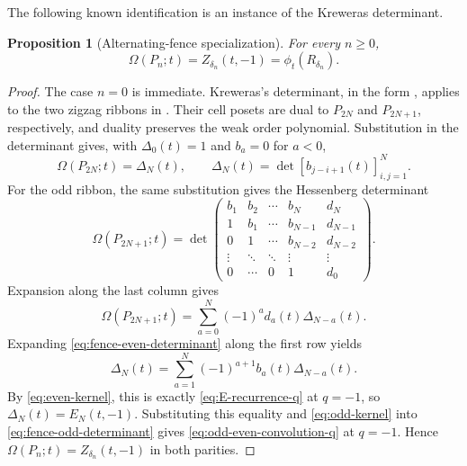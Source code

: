 \documentclass{amsart}
\newtheorem{proposition}[proposition]{Proposition}
\theoremstyle{definition}
\theoremstyle{remark}
\begin{document}
The following known identification is an instance of the Kreweras
determinant.

\begin{proposition}[Alternating-fence specialization]
\label{prop:staircase-specialization}
For every \(n\geq0\),
\begin{equation}
 \Omega(P_n;t)=Z_{\delta_n}(t,-1)=\phi_t(R_{\delta_n}).
 \label{eq:staircase-specialization}
\end{equation}
\end{proposition}

\begin{proof}
The case $n=0$ is immediate.  Kreweras's determinant, in the form
\cite[Proposition~2.2]{FerroniMoralesPanova}, applies to the two zigzag
ribbons in \cite[Equation~(5.1)]{FerroniMoralesPanova}.  Their cell posets are
dual to $P_{2N}$ and $P_{2N+1}$, respectively, and duality preserves the weak
order polynomial.  Substitution in the determinant gives, with
$\Delta_0(t)=1$ and $b_a=0$ for $a<0$,
\begin{equation}
 \Omega(P_{2N};t)=\Delta_N(t),
 \qquad
 \Delta_N(t)=\det[b_{j-i+1}(t)]_{i,j=1}^{N}.
 \label{eq:fence-even-determinant}
\end{equation}
For the odd ribbon, the same substitution gives the Hessenberg determinant
\begin{equation*}
 \Omega(P_{2N+1};t)=
 \det\!\begin{pmatrix}
 b_1&b_2&\cdots&b_N&d_N\\
 1&b_1&\cdots&b_{N-1}&d_{N-1}\\
 0&1&\cdots&b_{N-2}&d_{N-2}\\
 \vdots&\ddots&\ddots&\vdots&\vdots\\
 0&\cdots&0&1&d_0
 \end{pmatrix}.
\end{equation*}
Expansion along the last column gives
\begin{equation}
 \Omega(P_{2N+1};t)
 =\sum_{a=0}^{N}(-1)^a d_a(t)\Delta_{N-a}(t).
 \label{eq:fence-odd-determinant}
\end{equation}
Expanding \eqref{eq:fence-even-determinant} along the first row yields
\[
 \Delta_N(t)=\sum_{a=1}^{N}(-1)^{a+1}b_a(t)\Delta_{N-a}(t).
\]
By \eqref{eq:even-kernel}, this is exactly
\eqref{eq:E-recurrence-q} at $q=-1$, so
$\Delta_N(t)=E_N(t,-1)$.  Substituting this equality and
\eqref{eq:odd-kernel} into \eqref{eq:fence-odd-determinant} gives
\eqref{eq:odd-even-convolution-q} at $q=-1$.  Hence
$\Omega(P_n;t)=Z_{\delta_n}(t,-1)$ in both parities.
\end{proof}
\end{document}
